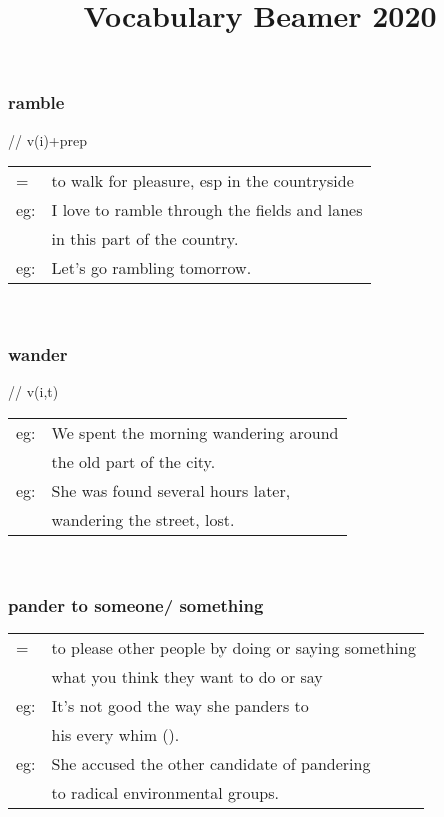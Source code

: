 \documentclass[14pt, t]{beamer}
\title{Vocabulary Beamer 2020}
\begin{document}
\setlength{\parindent}{0 in}
\newcommand{\schwar}{\textrhookschwa}
\newcommand{\threer}{\textrhookrevepsilon}
\newcommand{\tch}{\textteshlig}
\newcommand{\dzh}{\textdyoghlig}
\newcommand{\bl}{\backslash}
\newcommand{\tsup}{\textsuperscript}
\frame{\titlepage}
\begin{frame}
\frametitle{ramble}
// \quad v(i)+prep \\[8pt]
\begin{tabular}{ll}
= & to walk for pleasure, esp in the countryside \\[8pt]
eg: & I love to ramble through the fields and lanes \\[1pt]
& in this part of the country. \\[8pt]
eg: & Let's go rambling tomorrow. 
\end{tabular} \\
\end{frame}
\begin{frame}
\frametitle{wander}
/\textipa{'w6nd\schwar}/ \quad v(i,t) \\[8pt]
\begin{tabular}{ll}
eg: & We spent the morning wandering around \\[1pt]
	& the old part of the city. \\[8pt]
eg: & She was found several hours later, \\[1pt]
	& wandering the street, lost.
\end{tabular} \\
\end{frame}
\begin{frame} %
\frametitle{pander to someone/ something}
\begin{tabular}{ll}
= & to please other people by doing or saying something\\[1pt]
	& what you think they want to do or say \\[8pt]
eg: & It's not good the way she panders to \\[1pt]
	& his every whim (\textipa{wIm}). \\[8pt]
eg: & She accused the other candidate of pandering \\[1pt]
	& to radical environmental groups. 
\end{tabular}
\end{frame}
\end{document}
